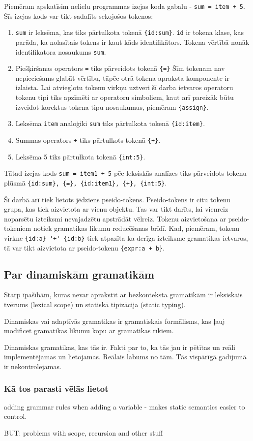 Piemēram apskatīsim nelielu programmas izejas koda gabalu - \verb|sum = item + 5|. Šīs izejas kods var tikt sadalīts sekojošos tokenos:
\begin{enumerate}
\item \verb|sum| ir leksēma, kas tiks pārtulkota tokenā \verb|{id:sum}|. \verb|id| ir tokena klase, kas parāda, ka nolasītais tokens ir kaut kāds identifikātors. Tokena vērtībā nonāk identifikatora nosaukums \verb|sum|.
\item Piešķiršanas operators \verb|=| tiks pārveidots tokenā \verb|{=}| Šīm tokenam nav nepieciešams glabāt vērtību, tāpēc otrā tokena apraksta komponente ir izlaista. Lai atvieglotu tokenu virkņu uztveri šī darba ietvaros operatoru tokenu tipi tiks apzīmēti ar operatoru simboliem, kaut arī pareizāk būtu izveidot korektus tokena tipu nosaukumus, piemēram \verb|{assign}|.
\item Leksēma \verb|item| analoģiki \verb|sum| tiks pārtulkota tokenā \verb|{id:item}|.
\item Summas operators \verb|+| tiks pārtulkots tokenā \verb|{+}|.
\item Leksēma 5 tiks pārtulkota tokenā \verb|{int:5}|.
\end{enumerate}

Tātad izejas kods \verb|sum = item1 + 5| pēc leksiskās analīzes tiks pārveidots tokenu plūsmā \verb|{id:sum}, {=}, {id:item1}, {+}, {int:5}|. \cite{DragonBook}

Šī darbā arī tiek lietots jēdziens pseido-tokens. Pseido-tokens ir citu tokenu grupa, kas tiek aizvietota ar vienu objektu. Tas var tikt darīts, lai vienreiz noparsētu izteiksmi nevajadzētu apstrādāt vēlreiz. Tokenu aizvietošana ar pseido-tokeniem notiek gramatikas likumu reducēšanas brīdī. Kad, piemēram, tokenu virkne \verb|{id:a} '+' {id:b}| tiek atpazīta ka derīga izteiksme gramatikas ietvaros, tā var tikt aizvietota ar pseido-tokenu \verb|{expr:a + b}|.

\subsection{\label{subsec:dynamicgrammars}Par dinamiskām gramatikām}

Starp īpašībām, kuras nevar aprakstīt ar bezkonteksta gramatikām ir leksiskais tvērums (lexical scope) un statiskā tipizācija (static typing).

Dinamiskas vai adaptīvās gramatikas ir gramatiskais formālisms, kas ļauj modificēt gramatikas likumu kopu ar gramatikas rīkiem. \cite{Shutt:AdaptiveGrammars}

Dinamiskas gramatikas, kas tās ir. Fakti par to, ka tās jau ir pētītas un reāli implementējamas un lietojamas. Reālais labums no tām.
 Tās vispārīgā gadījumā ir nekontrolējamas.

\subsubsection{Kā tos parasti vēlās lietot}
adding grammar rules when adding a variable - makes static semantics easier to control.

BUT: problems with scope, recursion and other stuff \cite{Christiansen:SurveyAdaptableGrammars}